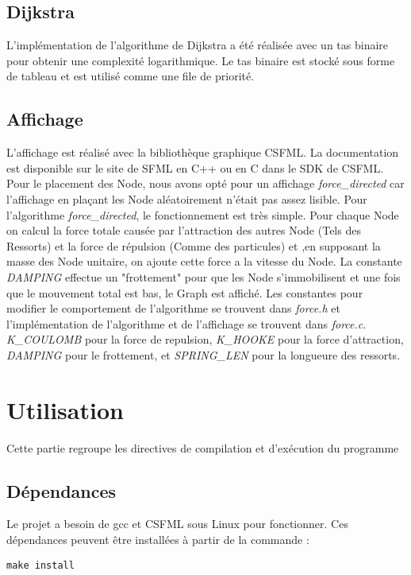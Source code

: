 \documentclass{article}
\begin{document}
\subsection{Dijkstra}
L'implémentation de l'algorithme de Dijkstra a été réalisée avec un tas binaire pour obtenir une complexité logarithmique.
Le tas binaire est stocké sous forme de tableau et est utilisé comme une file de priorité.

\subsection{Affichage}

L'affichage est réalisé avec la bibliothèque graphique CSFML. La documentation est disponible sur le site de SFML en C++ ou en C dans le SDK de CSFML. Pour le placement des Node, nous avons opté pour un affichage \textit{force_directed} car l'affichage en plaçant les Node aléatoirement n'était pas assez lisible. 
Pour l'algorithme \textit{force_directed}, le fonctionnement est très simple. Pour chaque Node on calcul la force totale causée par l'attraction des autres Node (Tels des Ressorts) et la force de répulsion (Comme des particules) et ,en supposant la masse des Node unitaire, on ajoute cette force a la vitesse du Node. La constante \textit{DAMPING} effectue un "frottement" pour que les Node s'immobilisent et une fois que le mouvement total est bas, le Graph est affiché.
Les constantes pour modifier le comportement de l'algorithme se trouvent dans \textit{force.h} et l'implémentation de l'algorithme et de l'affichage se trouvent dans \textit{force.c}.
\textit{K_COULOMB} pour la force de repulsion, \textit{K_HOOKE} pour la force d'attraction, \textit{DAMPING} pour le frottement, et \textit{SPRING_LEN} pour la longueure des ressorts.

\break\section{Utilisation}
Cette partie regroupe les directives de compilation et d'exécution du programme
\subsection{Dépendances}
Le projet a besoin de gcc et CSFML sous Linux pour fonctionner. Ces dépendances peuvent être installées à partir de la commande :
\begin{verbatim}
make install
\end{verbatim}
\end{document}
